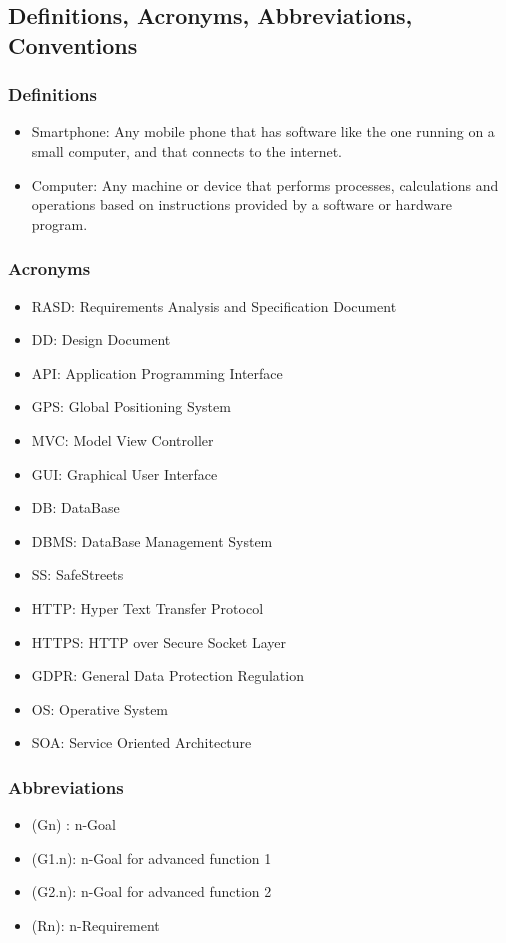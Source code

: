 \subsection{Definitions, Acronyms, Abbreviations, Conventions}
\subsubsection{Definitions}
\begin{itemize}
	\item Smartphone: Any mobile phone that has software like the one running on a small computer, and that connects to the internet.
	\item Computer: Any machine or device that performs processes, calculations and operations based on instructions provided by a software or hardware program.
\end{itemize}
\subsubsection{Acronyms}
\begin{itemize}
	\item RASD: Requirements Analysis and Specification Document
	\item DD: Design Document
	\item API: Application Programming Interface
	\item GPS: Global Positioning System
	\item MVC: Model View Controller
	\item GUI: Graphical User Interface
	\item DB: DataBase
	\item DBMS: DataBase Management System
	\item SS: SafeStreets
	\item HTTP: Hyper Text Transfer Protocol
	\item HTTPS: HTTP over Secure Socket Layer
	\item GDPR: General Data Protection Regulation
	\item OS: Operative System
	\item SOA: Service Oriented Architecture
\end{itemize}
\subsubsection{Abbreviations}
\begin{itemize}
	\item (Gn) : n-Goal
	\item (G1.n): n-Goal for advanced function 1
	\item (G2.n): n-Goal for advanced function 2
	\item (Rn): n-Requirement
\end{itemize}

